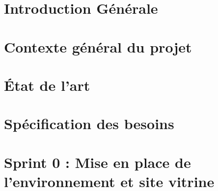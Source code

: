 \documentclass[a4paper, oneside, 12pt, final]{extreport}
\begin{document}
\newpage
\tableofcontents
\listoffigures
\listoftables

\newpage
{}

\chapter*{Introduction Générale}


\chapter{Contexte général du projet}
\label{chap:1}


\chapter{État de l'art}
\label{chap:2}


\chapter{Spécification des besoins}
\label{chap:3}


\chapter{Sprint 0 : Mise en place de l'environnement et site vitrine}
\label{chap:4}

\end{document}
